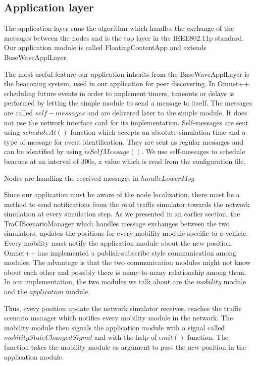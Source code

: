 \subsection{Application layer}

The application layer runs the algorithm which handles the exchange of the
messages between the nodes and is the top layer in the IEEE802.11p standard. Our
application module is called FloatingContentApp and extends BaseWaveApplLayer.

The most useful feature our application inherits from the BaseWaveApplLayer is
the beaconing system, used in our application for peer discovering. In Omnet++
scheduling future events in order to implement timers, timeouts or delays is
performed by letting the simple module to send a message to itself. The messages
are called $self-messages$ and are delivered later to the simple module. It does
not use the network interface card for its implementation. Self-messages are
sent using $scheduleAt()$ function which accepts an absolute simulation time and a
type of message for event identification. They are sent as regular messages and
can be identified by using $isSelfMessage()$. We use self-messages to schedule
beacons at an interval of 300s, a value which is read from the configuration file.

Nodes are handling the received messages in $handleLowerMsg$ 

Since our application must be aware of the node localization, there must be a
method to send notifications from the road traffic simulator towards the network
simulation at every simulation step. As we presented in an earlier section, the
TraCIScenarioManager which handles message exchanges between the two simulators,
updates the positions for every mobility module specific to a vehicle. Every
mobility must notify the application module about the new position. Omnet++ has
implemented a publish-subscribe style communication among modules. The advantage
is that the two communication modules might not know about each other and
possibly there is many-to-many relationship among them. In our implementation,
the two modules we talk about are the $mobility$ module and the $application$
module.

Thus, every position update the network simulator receives, reaches the
traffic scenario manager which notifies every mobility module in the network.
The mobility module then signals the application module with a signal called
$mobilityStateChangedSignal$ and with the help of $emit()$ function. The function
takes the mobility module as argument to pass the new position in the
application module.


